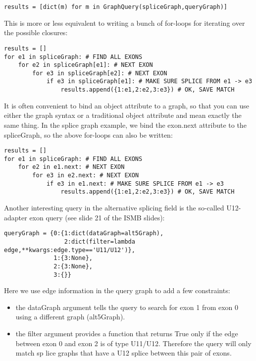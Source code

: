 \documentclass{howto}
\begin{document}
\begin{verbatim}
results = [dict(m) for m in GraphQuery(spliceGraph,queryGraph)]
\end{verbatim}

This is more or less equivalent to writing a bunch of for-loops for iterating over the possible closures:

\begin{verbatim}
results = []
for e1 in spliceGraph: # FIND ALL EXONS
    for e2 in spliceGraph[e1]: # NEXT EXON
        for e3 in spliceGraph[e2]: # NEXT EXON
            if e3 in spliceGraph[e1]: # MAKE SURE SPLICE FROM e1 -> e3
                results.append({1:e1,2:e2,3:e3}) # OK, SAVE MATCH
\end{verbatim}

It is often convenient to bind an object attribute to a graph, so that you can use either the graph syntax or a traditional object attribute and mean exactly the same thing.  In the splice graph example, we bind the exon.next attribute to the spliceGraph, so the above for-loops can also be written:

\begin{verbatim}
results = []
for e1 in spliceGraph: # FIND ALL EXONS
    for e2 in e1.next: # NEXT EXON
        for e3 in e2.next: # NEXT EXON
            if e3 in e1.next: # MAKE SURE SPLICE FROM e1 -> e3
                results.append({1:e1,2:e2,3:e3}) # OK, SAVE MATCH
\end{verbatim}

Another interesting query in the alternative splicing field is the so-called U12-adapter exon query (see slide 21 of the ISMB slides):

\begin{verbatim}
queryGraph = {0:{1:dict(dataGraph=alt5Graph),
                 2:dict(filter=lambda edge,**kwargs:edge.type=='U11/U12')},
              1:{3:None},
              2:{3:None},
              3:{}}
\end{verbatim}

Here we use edge information in the query graph to add a few constraints:

\begin{itemize}
\item
the dataGraph argument tells the query to search for exon 1 from exon 0 using a different graph (alt5Graph).

\item    
the filter argument provides a function that returns True only if the edge between exon 0 and exon 2 is of type U11/U12.  Therefore the query will only match sp
lice graphs that have a U12 splice between this pair of exons.

\end{itemize}
\end{document}
